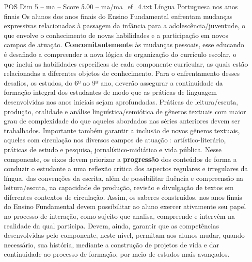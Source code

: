 \begin{textsample}{POS Dim 5 – ma – Score 5.00 – ma/ma\_ef\_4.txt}  \label{ex:f5_pos_175}
Língua Portuguesa nos anos finais Os alunos dos anos finais do Ensino Fundamental enfrentam mudanças expressivas relacionadas à passagem da infância para a adolescência/juventude, o que envolve o conhecimento de novas habilidades e a participação em novos campos de atuação. \textbf{Concomitantemente} às mudanças pessoais, esse educando é desafiado a compreender a nova lógica de organização do currículo escolar, o que inclui as habilidades específicas de cada componente curricular, as quais estão relacionadas a diferentes objetos de conhecimento.
Para o enfrentamento desses desafios, os estudos, do 6º ao 9º ano, deverão assegurar a continuidade da formação integral dos estudantes de modo que as práticas de linguagem desenvolvidas nos anos iniciais sejam aprofundadas.
Práticas de leitura/escuta, produção, oralidade e análise linguística/semiótica de gêneros textuais com maior grau de complexidade do que aqueles abordados nas séries anteriores devem ser trabalhados.
Importante também garantir a inclusão de novos gêneros textuais, aqueles com circulação nos diversos campos de atuação : artístico-literário, práticas de estudo e pesquisa, jornalístico-midiático e vida pública.
Nesse componente, os eixos devem priorizar a \textbf{progressão} dos conteúdos de forma a conduzir o estudante a uma reflexão crítica dos aspectos regulares e irregulares da língua, das convenções da escrita, além de possibilitar fluência e compreensão na leitura/escuta, na capacidade de produção, revisão e divulgação de textos em diferentes contextos de circulação.
Assim, os saberes construídos, nos anos finais do Ensino Fundamental devem possibilitar ao aluno exercer ativamente seu papel no processo de interação, como sujeito que analisa, compreende e intervém na realidade da qual participa.
Devem, ainda, garantir que as competências desenvolvidas pelo componente, neste nível, permitam aos alunos mudar, quando necessário, sua história, mediante a construção de projetos de vida e dar continuidade ao processo de formação, por meio de estudos mais avançados.

\end{textsample}
